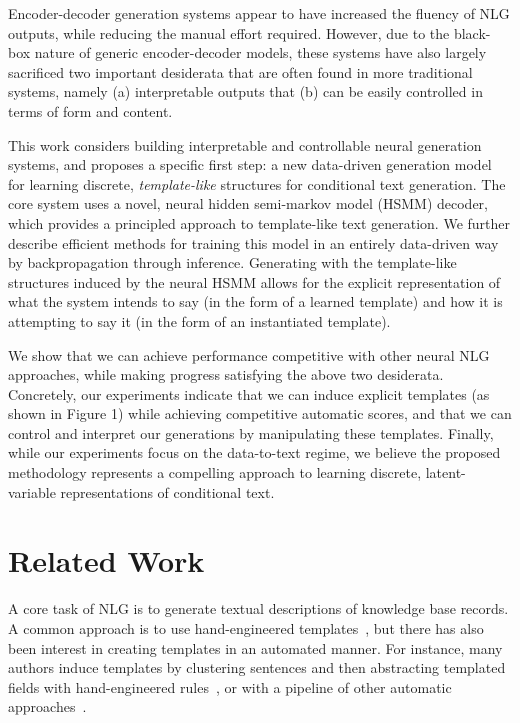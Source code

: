 \documentclass[11pt,a4paper]{article}
\begin{document}
Encoder-decoder generation systems appear to have increased the fluency of NLG outputs, while reducing the manual effort required. However, due to the black-box nature of generic encoder-decoder models, these systems have also largely sacrificed two important desiderata that are often found in more traditional systems, namely (a) interpretable outputs that (b) can be easily controlled in terms of form and content. %



This work considers building interpretable and controllable neural generation systems, and proposes a specific first step: a new data-driven generation model for learning discrete, \textit{template-like} structures for conditional text generation. The core system uses a novel, neural hidden semi-markov model (HSMM) decoder, which provides a principled approach to template-like text generation. We further describe efficient methods for training this model in an entirely data-driven way by backpropagation through inference. 
Generating with the template-like structures induced by the neural HSMM allows for the explicit representation of what the system intends to say (in the form of a learned template) and how it is attempting to say it (in the form of an instantiated template). 

We show that we can achieve performance competitive with other neural NLG approaches, while making progress satisfying the above two desiderata. Concretely, our experiments indicate that we can induce explicit templates (as shown in Figure 1) while achieving competitive automatic scores, and that we can control and interpret our generations by manipulating these templates. Finally, while our experiments focus on the data-to-text regime, we believe the proposed methodology represents a compelling approach to learning discrete, latent-variable representations of conditional text.

\section{Related Work}
\label{sec:relatedwork}
A core task of NLG is to generate textual descriptions of knowledge base records. A common approach is to use hand-engineered templates~\citep{kukich1983design,mckeown1992text,mcroy2000yag}, but there has also been interest in creating templates in an automated manner. For instance, many authors induce templates by clustering sentences and then abstracting templated fields with hand-engineered rules~\citep{angeli2010simple,kondadadi2013statistical,howald2013domain}, or with a pipeline of other automatic approaches~\citep{wang2013domain}. 
\end{document}
